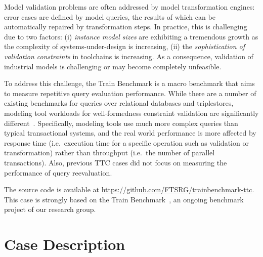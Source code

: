 \documentclass[submission,copyright,creativecommons]{eptcs}
\newcommand{\tb}{Train Benchmark\xspace}
\begin{document}
Model validation problems are often addressed by model transformation engines: error cases are defined by model queries, the results of which can be automatically repaired by transformation steps. In practice, this is challenging due to two factors: (i) \emph{instance model sizes} are exhibiting a tremendous growth as the complexity of systems-under-design is increasing, (ii) the \emph{sophistication of validation constraints} in toolchains is increasing. As a consequence, validation of industrial models is challenging or may become completely unfeasible.

To address this challenge, the \tb is a macro benchmark that aims to measure repetitive query evaluation performance. While there are a number of existing benchmarks for queries over relational databases%
and triplestores, %
modeling tool workloads for well-formedness constraint validation are significantly different~\cite{ase2013}. Specifically, modeling tools use much more complex queries than typical transactional systems, and the real world performance is more affected by response time (i.e.\ execution time for a specific operation such as validation or transformation) rather than throughput (i.e.\ the number of parallel transactions). Also, previous TTC cases did not focus on measuring the performance of query reevaluation.


The source code is available at \url{https://github.com/FTSRG/trainbenchmark-ttc}. This case is strongly based on the \tb~\cite{TrainBenchmarkTechReport}, an ongoing benchmark project of our research group. 


\section{Case Description}
\end{document}
